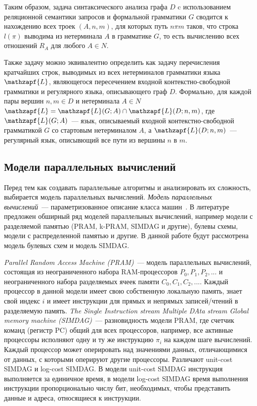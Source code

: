Таким образом, задача синтаксического анализа графа $D$ c
использованием реляционной семантики запросов и формальной
грамматики $G$ сводится к нахождению всех троек $(A, n, m)$, для
которых путь $n\pi m$ таков, что строка $l(\pi)$ выводима из нетерминала
$A$ в грамматике $G$, то есть вычислению всех отношений $R_A$ для
любого $A \in N$.

Также задачу можно эквивалентно определить как задачу перечисления кратчайших строк, выводимых из всех нетерминалов грамматики языка $\mathzapf{L}$, являющегося пересечением входной контекстно-свободной грамматики и регулярного языка, описывающего граф $D$. Формально, для каждой пары вершин $n, m \in D$ и нетерминала $A \in N$ $\mathzapf{L} = \mathzapf{L}(G; A) \cap  \mathzapf{L}(D; n, m)$, где $\mathzapf{L}(G; A)$~--- язык, описываемый входной контекстно-свободной грамматикой $G$ со стартовым нетерминалом $A$, а $\mathzapf{L}(D; n, m)$~--- регулярный язык, описывющий все пути из вершины $n$ в $m$.

\subsection{Модели параллельных вычислений}
Перед тем как создавать параллельные алгоритмы и анализировать их сложность, выбирается модель параллельных вычислений. \textit{Модель параллельных вычислений}~--- параметризованное описание класса машин~\cite{PCompl}. В литературе предложен обширный ряд моделей параллельных вычислений, например модели с разделяемой памятью (PRAM, k-PRAM, SIMDAG и другие), булевы схемы, модели с распределенной памятью и другие. В данной работе будут рассмотрена модель булевых схем и модель SIMDAG.

\textit{Parallel Random Access Machine (PRAM)}~--- модель параллельных вычислений, состоящая из неограниченного набора RAM-процессоров $P_0, P_1, P_2, ... $ и неограниченного набора разделяемых ячеек памяти $C_0, C_1, C_2, ... $. Каждый процессор в данной модели имеет свою собственную локальную память, знает свой индекс $i$ и имеет инструкции для прямых и непрямых записей/чтений в разделяемую память. \textit{The Single Instruction stream Multiple DAta stream Global memory machine (SIMDAG)}~--- разновидность модели PRAM, где счетчик команд (регистр PC) общий для всех процессоров, например, все активные процессоры исполняют одну и ту же инструкцию $\pi_i$ на каждом шаге вычислений. Каждый процессор может оперировать над значениями данных, отличающимися от данных, с которыми оперируют другие процессоры. Различают unit-cost SIMDAG и log-cost SIMDAG. В модели unit-cost SIMDAG инструкция выполняется за единичное время, в модели log-cost SIMDAG время выполнения инструкции пропорционально числу бит, необходимых, чтобы представить данные и адреса, относящиеся к инструкции.

